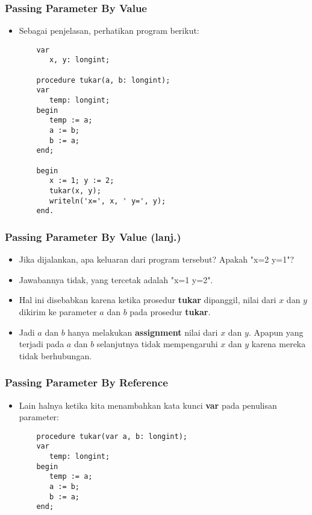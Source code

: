 \documentclass{beamer}
\begin{document}
\begin{frame}[fragile]
\frametitle{Passing Parameter By Value}
\begin{itemize}
    \item Sebagai penjelasan, perhatikan program berikut:
    \begin{lstlisting}
    var
       x, y: longint;

    procedure tukar(a, b: longint);
    var
       temp: longint;
    begin
       temp := a;
       a := b;
       b := a;
    end;

    begin
       x := 1; y := 2;
       tukar(x, y);
       writeln('x=', x, ' y=', y);
    end.
    \end{lstlisting}
\end{itemize}
\end{frame}

\begin{frame}[fragile]
\frametitle{Passing Parameter By Value (lanj.)}
\begin{itemize}
    \item Jika dijalankan, apa keluaran dari program tersebut? Apakah "x=2 y=1"?
    \item Jawabannya \alert{tidak}, yang tercetak adalah "x=1 y=2".
    \item Hal ini disebabkan karena ketika prosedur \textbf{tukar} dipanggil, \alert{nilai} dari $x$ dan $y$ dikirim ke parameter $a$ dan $b$ pada prosedur \textbf{tukar}.
    \item Jadi $a$ dan $b$ hanya melakukan \textbf{assignment} nilai dari $x$ dan $y$. Apapun yang terjadi pada $a$ dan $b$ selanjutnya tidak mempengaruhi $x$ dan $y$ karena mereka \alert{tidak berhubungan}.
\end{itemize}
\end{frame}

\begin{frame}[fragile]
\frametitle{Passing Parameter By Reference}
\begin{itemize}
    \item Lain halnya ketika kita menambahkan kata kunci \textbf{var} pada penulisan parameter:
    \begin{lstlisting}
    procedure tukar(var a, b: longint);
    var
       temp: longint;
    begin
       temp := a;
       a := b;
       b := a;
    end;
    \end{lstlisting}
\end{itemize}
\end{frame}
\end{document}

